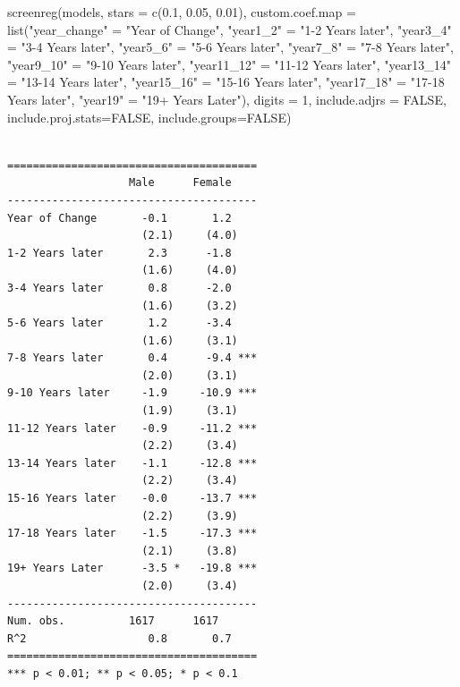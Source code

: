 \documentclass[
  letterpaper,
  DIV=11,
  numbers=noendperiod]{scrartcl}
\newenvironment{Shaded}{\begin{snugshade}}{\end{snugshade}}
\newcommand{\AttributeTok}[1]{\textcolor[rgb]{0.40,0.45,0.13}{#1}}
\newcommand{\ConstantTok}[1]{\textcolor[rgb]{0.56,0.35,0.01}{#1}}
\newcommand{\DecValTok}[1]{\textcolor[rgb]{0.68,0.00,0.00}{#1}}
\newcommand{\FloatTok}[1]{\textcolor[rgb]{0.68,0.00,0.00}{#1}}
\newcommand{\FunctionTok}[1]{\textcolor[rgb]{0.28,0.35,0.67}{#1}}
\newcommand{\NormalTok}[1]{\textcolor[rgb]{0.00,0.23,0.31}{#1}}
\newcommand{\OtherTok}[1]{\textcolor[rgb]{0.00,0.23,0.31}{#1}}
\newcommand{\StringTok}[1]{\textcolor[rgb]{0.13,0.47,0.30}{#1}}
\begin{document}
\begin{Shaded}
\begin{Highlighting}[]
\FunctionTok{screenreg}\NormalTok{(models, }\AttributeTok{stars =} \FunctionTok{c}\NormalTok{(}\FloatTok{0.1}\NormalTok{, }\FloatTok{0.05}\NormalTok{, }\FloatTok{0.01}\NormalTok{), }
  \AttributeTok{custom.coef.map =} \FunctionTok{list}\NormalTok{(}\StringTok{"year\_change"} \OtherTok{=} \StringTok{"Year of Change"}\NormalTok{,}
                    \StringTok{"year1\_2"} \OtherTok{=} \StringTok{"1{-}2 Years later"}\NormalTok{,}
                    \StringTok{"year3\_4"} \OtherTok{=} \StringTok{"3{-}4 Years later"}\NormalTok{,}
                    \StringTok{"year5\_6"} \OtherTok{=} \StringTok{"5{-}6 Years later"}\NormalTok{,}
                    \StringTok{"year7\_8"} \OtherTok{=} \StringTok{"7{-}8 Years later"}\NormalTok{,}
                    \StringTok{"year9\_10"} \OtherTok{=} \StringTok{"9{-}10 Years later"}\NormalTok{,}
                    \StringTok{"year11\_12"} \OtherTok{=} \StringTok{"11{-}12 Years later"}\NormalTok{,}
                    \StringTok{"year13\_14"} \OtherTok{=} \StringTok{"13{-}14 Years later"}\NormalTok{,}
                    \StringTok{"year15\_16"} \OtherTok{=} \StringTok{"15{-}16 Years later"}\NormalTok{,}
                    \StringTok{"year17\_18"} \OtherTok{=} \StringTok{"17{-}18 Years later"}\NormalTok{,}
                    \StringTok{"year19"} \OtherTok{=} \StringTok{"19+ Years Later"}\NormalTok{),}
  \AttributeTok{digits =} \DecValTok{1}\NormalTok{, }\AttributeTok{include.adjrs =} \ConstantTok{FALSE}\NormalTok{, }\AttributeTok{include.proj.stats=}\ConstantTok{FALSE}\NormalTok{, }\AttributeTok{include.groups=}\ConstantTok{FALSE}\NormalTok{)}
\end{Highlighting}
\end{Shaded}

\begin{verbatim}

=======================================
                   Male      Female    
---------------------------------------
Year of Change       -0.1       1.2    
                     (2.1)     (4.0)   
1-2 Years later       2.3      -1.8    
                     (1.6)     (4.0)   
3-4 Years later       0.8      -2.0    
                     (1.6)     (3.2)   
5-6 Years later       1.2      -3.4    
                     (1.6)     (3.1)   
7-8 Years later       0.4      -9.4 ***
                     (2.0)     (3.1)   
9-10 Years later     -1.9     -10.9 ***
                     (1.9)     (3.1)   
11-12 Years later    -0.9     -11.2 ***
                     (2.2)     (3.4)   
13-14 Years later    -1.1     -12.8 ***
                     (2.2)     (3.4)   
15-16 Years later    -0.0     -13.7 ***
                     (2.2)     (3.9)   
17-18 Years later    -1.5     -17.3 ***
                     (2.1)     (3.8)   
19+ Years Later      -3.5 *   -19.8 ***
                     (2.0)     (3.4)   
---------------------------------------
Num. obs.          1617      1617      
R^2                   0.8       0.7    
=======================================
*** p < 0.01; ** p < 0.05; * p < 0.1
\end{verbatim}
\end{document}
